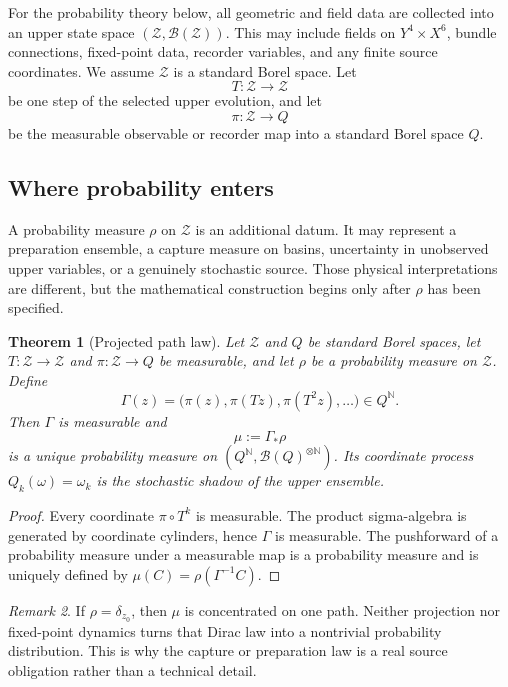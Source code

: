 \documentclass[11pt]{article}
\newtheorem{theorem}{Theorem}[section]
\theoremstyle{definition}
\theoremstyle{remark}
\newtheorem{remark}[theorem]{Remark}
\newcommand{\N}{\mathbb{N}}
\newcommand{\cB}{\mathcal{B}}
\newcommand{\cZ}{\mathcal{Z}}
\begin{document}
For the probability theory below, all geometric and field data are collected
into an upper state space \((\cZ,\cB(\cZ))\).  This may include fields on
\(Y^4\times X^6\), bundle connections, fixed-point data, recorder variables,
and any finite source coordinates.  We assume \(\cZ\) is a standard Borel
space.  Let
\[
T:\cZ\longrightarrow\cZ
\]
be one step of the selected upper evolution, and let
\[
\pi:\cZ\longrightarrow Q
\]
be the measurable observable or recorder map into a standard Borel space
\(Q\).

\subsection{Where probability enters}

A probability measure \(\rho\) on \(\cZ\) is an additional datum.  It may
represent a preparation ensemble, a capture measure on basins, uncertainty in
unobserved upper variables, or a genuinely stochastic source.  Those physical
interpretations are different, but the mathematical construction begins only
after \(\rho\) has been specified.

\begin{theorem}[Projected path law]\label{thm:projected-law}
Let \(\cZ\) and \(Q\) be standard Borel spaces, let \(T:\cZ\to\cZ\) and
\(\pi:\cZ\to Q\) be measurable, and let \(\rho\) be a probability measure on
\(\cZ\).  Define
\[
\Gamma(z)=\bigl(\pi(z),\pi(Tz),\pi(T^2z),\ldots\bigr)\in Q^{\N}.
\]
Then \(\Gamma\) is measurable and
\[
\mu:=\Gamma_{\ast}\rho
\]
is a unique probability measure on
\((Q^{\N},\cB(Q)^{\otimes\N})\).  Its coordinate process
\(Q_k(\omega)=\omega_k\) is the stochastic shadow of the upper ensemble.
\end{theorem}

\begin{proof}
Every coordinate \(\pi\circ T^k\) is measurable.  The product sigma-algebra is
generated by coordinate cylinders, hence \(\Gamma\) is measurable.  The
pushforward of a probability measure under a measurable map is a probability
measure and is uniquely defined by
\(\mu(C)=\rho(\Gamma^{-1}C)\).
\end{proof}

\begin{remark}
If \(\rho=\delta_{z_0}\), then \(\mu\) is concentrated on one path.  Neither
projection nor fixed-point dynamics turns that Dirac law into a nontrivial
probability distribution.  This is why the capture or preparation law is a
real source obligation rather than a technical detail.
\end{remark}
\end{document}
